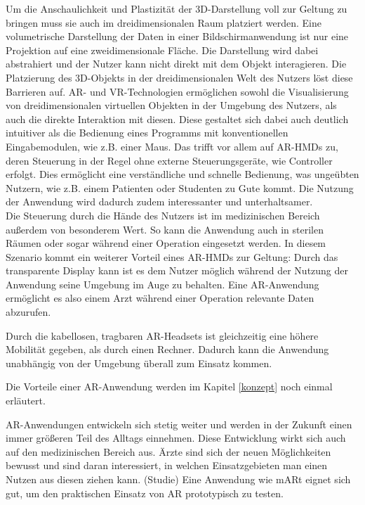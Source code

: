 Um die Anschaulichkeit und Plastizität der 3D-Darstellung voll zur Geltung zu bringen muss sie auch im dreidimensionalen Raum platziert werden. Eine volumetrische Darstellung der Daten in einer Bildschirmanwendung ist nur eine Projektion auf eine zweidimensionale Fläche. Die Darstellung wird dabei abstrahiert und der Nutzer kann nicht direkt mit dem Objekt interagieren.
Die Platzierung des 3D-Objekts in der dreidimensionalen Welt des Nutzers löst diese Barrieren auf. AR- und VR-Technologien ermöglichen sowohl die Visualisierung von dreidimensionalen virtuellen Objekten in der Umgebung des Nutzers, als auch die direkte Interaktion mit diesen. Diese gestaltet sich dabei auch deutlich intuitiver als die Bedienung eines Programms mit konventionellen Eingabemodulen, wie z.B. einer Maus. Das trifft vor allem auf AR-HMDs zu, deren Steuerung in der Regel ohne externe Steuerungsgeräte, wie Controller erfolgt. Dies ermöglicht eine verständliche und schnelle Bedienung,  was ungeübten Nutzern, wie z.B. einem Patienten oder Studenten zu Gute kommt. Die Nutzung der Anwendung wird dadurch zudem interessanter und unterhaltsamer.\\

Die Steuerung durch die Hände des Nutzers ist im medizinischen Bereich außerdem von besonderem Wert. So kann die Anwendung auch in sterilen Räumen oder sogar während einer Operation eingesetzt werden. In diesem Szenario kommt ein weiterer Vorteil eines AR-HMDs zur Geltung: Durch das transparente Display kann ist es dem Nutzer möglich während der Nutzung der Anwendung seine Umgebung im Auge zu behalten. 
Eine AR-Anwendung ermöglicht es also einem Arzt während einer Operation relevante Daten abzurufen.

Durch die kabellosen, tragbaren AR-Headsets ist gleichzeitig eine höhere Mobilität gegeben, als durch einen Rechner. Dadurch kann die Anwendung unabhängig von der Umgebung überall zum Einsatz kommen. 

Die Vorteile einer AR-Anwendung werden im Kapitel \ref{konzept} noch einmal erläutert.

AR-Anwendungen entwickeln sich stetig weiter und werden in der Zukunft einen immer größeren Teil des Alltags einnehmen. Diese Entwicklung wirkt sich auch auf den medizinischen Bereich aus. 
Ärzte sind sich der neuen Möglichkeiten bewusst und sind daran interessiert, 
in welchen Einsatzgebieten man einen Nutzen aus diesen ziehen kann. (Studie)
Eine Anwendung wie mARt eignet sich gut, um den praktischen Einsatz von AR prototypisch zu testen.

